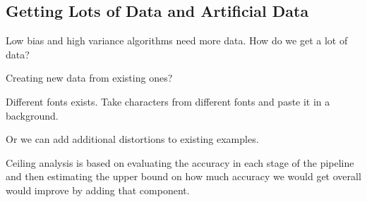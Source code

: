 \documentclass{article}
\begin{document}
\subsection{Getting Lots of Data and Artificial Data}

Low bias and high variance algorithms need more data. How do we get a lot of data?

Creating new data from existing ones?


Different fonts exists. Take characters from different fonts and paste it in a background. 

Or we can add additional distortions to existing examples.



Ceiling analysis is based on evaluating the accuracy in each stage of the pipeline and then estimating the upper bound on how much accuracy we would get overall would improve by adding that component.
\end{document}
